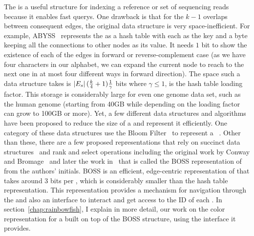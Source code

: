 The \dbg is a useful structure for indexing a reference or set of sequencing reads
because it enables fast querys.
One drawback is that for the $k-1$ overlaps between consequent edges,
the original data structure is very space-inefficient. For example,
ABYSS~\cite{simpson2009abyss} represents the \dbg as a hash table with each \kmer
as the key and a byte keeping all the connections to other nodes as its value.
It needs $1$ bit to show the existence of each of the edges in forward or reverse-complement case
(as we have four characters in our alphabet, we can expand the current node
to reach to the next one in at most four different ways in forward direction).
The space such a data structure takes is $\left|E_s\right|(\frac{k}{4}+1)\frac{1}{\gamma}$ bits
where $\gamma \leq 1$, is the hash table loading factor.
This storage is considerably large for even one genome data set,
such as the human genome (starting from 40GB while depending on the loading factor can grow to 100GB or more).
Yet, a few different data structures and algorithms have been proposed to reduce the size of a \dbg
and represent it efficiently. One category of these data structures use the Bloom Filter~\cite{bloom1970space}
to represent a \dbg~\cite{pell2012scaling,salikhov2013using,chikhi2012space,chikhi2013space,holley2016bloom}.
Other than these, there are a few proposed representations
that rely on succinct data structures~\cite{gbmp2014sea}
and rank and select operations including the original work by Conway and Bromage~\cite{conway2011succinct}
and later the work in~\cite{BoweOn12} that is called the BOSS representation of \dbg from the authors’ initials.
BOSS is an efficient, edge-centric representation of \dbg that takes around 3 bits per \kmer,
which is considerably smaller than the hash table representation.
This representation provides a mechanism for navigation through the \dbg
and also an interface to interact and get access to the ID of each \kmer.
In section~\ref{chap:rainbowfish}, I explain in more detail, our work on the color representation
for a \dbg built on top of the BOSS structure, using the interface it provides.


